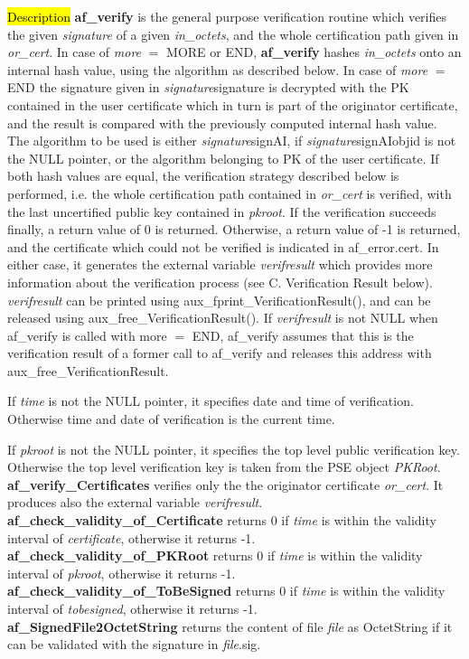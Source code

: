 \hl{Description}
{\bf af\_verify} is the general purpose verification routine which verifies the given
{\em signature} of a given {\em in\_octets}, and the whole certification path given
in {\em or\_cert}. 
In case of {\em more} $=$ MORE or END, {\bf af\_verify} hashes {\em in\_octets} onto
an internal hash value, using the algorithm as described below.
In case of {\em more} $=$ END the signature given in {\em signature}\pf signature
is decrypted with the PK contained in the user certificate which in turn is part of the
originator certificate, and the result is compared
with the previously computed internal hash value. The algorithm to be used is either 
{\em signature}\pf signAI, if {\em signature}\pf signAI\pf objid is not the
NULL pointer, or the algorithm belonging to PK of the user certificate. If both hash values
are equal, the verification strategy described below is performed, i.e. the whole certification path
contained in {\em or\_cert} is verified, with the last uncertified public key
contained in {\em pkroot}. If the verification succeeds finally, a return value
of 0 is returned. Otherwise, a return value of -1 is returned, and the certificate which could
not be verified is indicated in af\_error.cert. In either case, it generates the external
variable {\em verifresult} which provides more information about the verification process (see C. Verification Result below).
{\em verifresult} can be printed using aux\_fprint\_VerificationResult(), and can be released
using aux\_free\_VerificationResult(). If {\em verifresult} is not NULL when af\_verify is
called with more $=$ END, af\_verify assumes that this is the verification result of a former call to
af\_verify and releases this address with aux\_free\_VerificationResult.

If {\em time} is not the NULL pointer, it specifies date and time of verification. Otherwise
time and date of verification is the current time.

If {\em pkroot} is not the NULL pointer, it specifies the top level public verification key.
Otherwise the top level verification key is taken from the PSE object {\em PKRoot}. \\ [1em]
{\bf af\_verify\_Certificates} verifies only the the originator certificate {\em or\_cert}.
It produces also the external variable {\em verifresult}.
\\ [1em]
{\bf af\_check\_validity\_of\_Certificate} returns 0 if {\em time} is within the validity interval
of {\em certificate}, otherwise it returns -1.
\\ [1em]
{\bf af\_check\_validity\_of\_PKRoot} returns 0 if {\em time} is within the validity interval
of {\em pkroot}, otherwise it returns -1.
\\ [1em]
{\bf af\_check\_validity\_of\_ToBeSigned} returns 0 if {\em time} is within the validity interval
of {\em tobesigned}, otherwise it returns -1.
\\ [1em]
{\bf af\_SignedFile2OctetString} returns the content of file {\em file} as OctetString
if it can be validated with the signature in {\em file}.sig.
 
